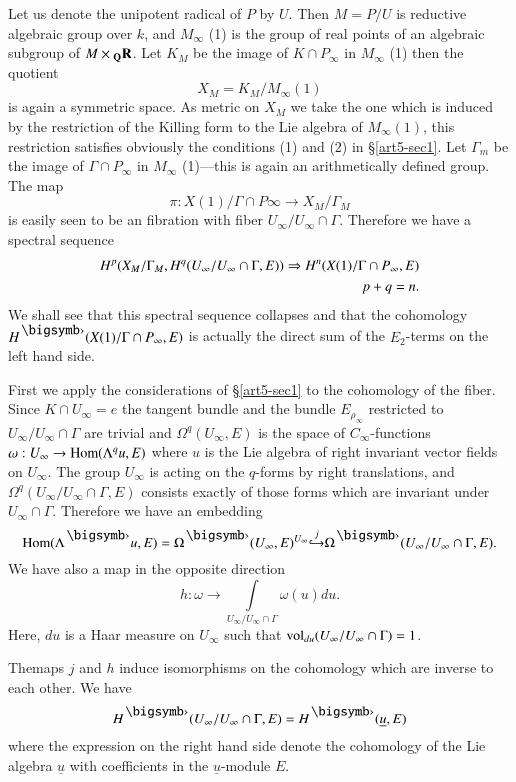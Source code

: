 Let us denote the unipotent radical of $P$ by $U$. Then $M = P/U$ is reductive algebraic group over $k$, and $M_\infty$ (1) is the group of real points of an algebraic subgroup of $M \times {}_{\mathbf{Q}} \mathbf{R}$. Let $K_M$ be the image of $K \cap P_\infty$ in $M_\infty$ (1) then the quotient
$$
X_M = K_M / M_\infty (1)
$$
is again a symmetric space. As metric on $X_M$ we take the one which is induced by the restriction of the Killing form to the Lie algebra of $M_\infty(1)$, this restriction satisfies obviously the conditions (1) and (2) in \S \ref{art5-sec1}. Let $\Gamma_m$ be the image of $\Gamma \cap P_\infty$ in $M_\infty$ (1)---this is again an arithmetically defined group. The map
$$
\pi : X (1) / \Gamma \cap P\infty \to X_M / \Gamma_M
$$
is easily seen to be an fibration with fiber $U_\infty/ U_\infty \cap \Gamma$. Therefore we have a spectral sequence
\setcounter{equation}{0}
\begin{align}
H^p (X_M / \Gamma_M, H^q(U_\infty/ U_\infty \cap \Gamma, E)) \Rightarrow H^n (X (1)/ \Gamma \cap P_\infty, E) &\label{art5-eq2.1}\\
p+q = n.&\notag
\end{align}
We shall see that this spectral sequence collapses and that the cohomology $H^\bigdot (X (1)/ \Gamma \cap P_\infty, E)$ is actually the direct sum of the $E_2$-terms on the left hand side.

First we apply the considerations of \S \ref{art5-sec1} to the cohomology of the fiber. Since $K \cap U_\infty = e$ the tangent bundle and the bundle $E_{\rho_\infty}$ restricted to $U_\infty/ U_\infty \cap \Gamma$ are trivial and $\Omega^q (U_\infty, E)$ is the space of $C_\infty$-functions $\omega : U_\infty \to \operatorname{Hom} (\Lambda^q u, E)$ where $u$ is the Lie algebra of right invariant vector fields on $U_\infty$. The group $U_\infty$ is acting on the $q$-forms by right translations, and $\Omega^q (U_\infty/ U_\infty \cap \Gamma, E)$ consists exactly of those forms which are invariant under $U_\infty \cap \Gamma$. Therefore we have an embedding
$$
\Hom (\Lambda^\bigdot u, E) = \Omega^\bigdot (U_\infty, E)^{U_\infty} {\displaystyle{\mathop{\hookrightarrow}^j}} \Omega^\bigdot (U_\infty/ U_\infty \cap \Gamma, E).
$$
We have also a map in the opposite direction
$$
h : \omega \to \int\limits_{U_\infty/ U_\infty \cap \Gamma} \omega (u) du.
$$
Here, $du$ is a Haar measure on $U_\infty$ such that $\operatorname{vol}_{du} (U_\infty / U_\infty \cap \Gamma) = 1$.

\begin{theorem}\label{art5-thm2.2}
The\pageoriginale maps $j$ and $h$ induce isomorphisms on the cohomology which are inverse to each other. We have
$$
H^\bigdot (U_\infty/ U_\infty \cap \Gamma, E) = H^\bigdot (\underline{u}, E)
$$
where the expression on the right hand side denote the cohomology of the Lie algebra $\underline{u}$ with coefficients in the $\underline{u}$-module $E$.
\end{theorem}

